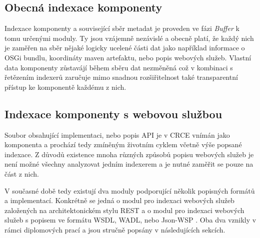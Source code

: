 \documentclass[czech,DP]{thesiskiv}
\begin{document}
\subsection{Obecná indexace komponenty}

Indexace komponenty a související sběr metadat je proveden ve fázi \textit{Buffer} k tomu určenými moduly. Ty jsou vzájemně nezávislé a obecně platí, že každý nich je zaměřen na sběr nějaké logicky ucelené části dat jako například informace o OSGi bundlu, koordináty maven artefaktu, nebo popis webových služeb. Vlastní data komponenty zůstavájí během sběru dat nezměněná což v kombinaci s řetězením indexerů zaručuje mimo snadnou rozšiřitelnost také transparentní přístup ke komponentě každému z nich. 

\subsection{Indexace komponenty s webovou službou}

Soubor obsahující implementaci, nebo popis API je v CRCE vnímán jako komponenta a prochází tedy zmíněným životním cyklem včetně výše popsané indexace. Z důvodů existence mnoha různých způsobů popisu webových služeb je není možné všechny analyzovat jedním indexerem a je nutné zaměřit se pouze na část z nich. 

V současné době tedy existují dva moduly podporující několik popisných formátů a implementací. Konkrétně se jedná o modul pro indexaci webových služeb založených na architektonickém stylu REST\cite{hessova2015rest} a o modul pro indexaci webových služeb s popisem ve formátu WSDL, WADL, nebo Json-WSP \cite{pejrimovsky2015ws}. Oba dva vznikly v rámci diplomových prací a jsou stručně popsány v následujících sekcích.

\end{document}
